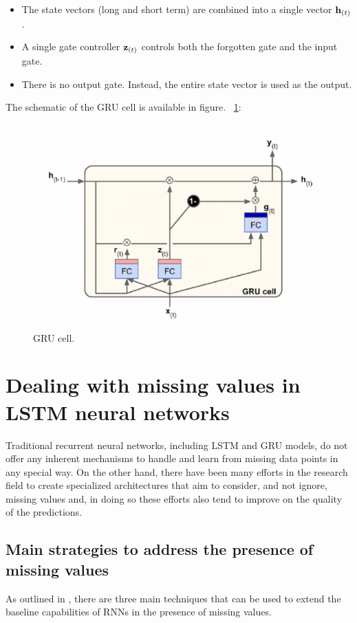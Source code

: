 \begin{itemize}
    \item The state vectors (long and short term) are combined into a single vector ${\bf h}_{(t)}$.
    \item A single gate controller ${\bf z}_{(t)}$ controls both the forgotten gate and the input gate.
    \item There is no output gate. Instead, the entire state vector is used as the output.
\end{itemize}
The schematic of the GRU cell is available in figure. ~\ref{fig:GRU_cell}:
\begin{figure} [h]
    \centering
    \includegraphics[width=\textwidth,height=\textheight,keepaspectratio]{Images/Theory_and_method/unnamed-9.png}
    \caption{GRU cell.}
    \label{fig:GRU_cell}
\end{figure}

\clearpage

\section{Dealing with missing values in LSTM neural networks} \label{dealwithmiss}
Traditional recurrent neural networks, including LSTM and GRU models, do not offer any inherent mechanisms to handle and learn from missing data points in any special way. On the other hand, there have been many efforts in the research field to create specialized architectures that aim to consider, and not ignore, missing values and, in doing so these efforts also tend to improve on the quality of the predictions. 

\subsection{Main strategies to address the presence of missing values}
As outlined in \citeauthor{Chollet2017-vd} \autocite{Chollet2017-vd}, there are three main techniques that can be used to extend the baseline capabilities of RNNs in the presence of missing values.

